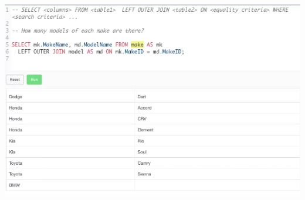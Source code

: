 \documentclass[12pt]{article}
\begin{document}
\begin{itemize}
\begin{itemize}
        \begin{center}
        \includegraphics[width=\linewidth]{images/part_4_notes_8.png}
        \end{center}


    \end{itemize}
\end{itemize}
\end{document}
